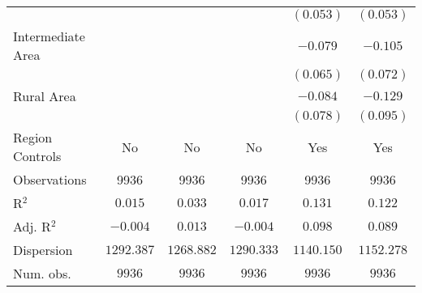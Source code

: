\begin{center}
\begin{tiny}
\begin{longtable}{l@{} c@{} c@{} c@{} c@{} c@{}}
                                                      &                 &                  &                 & $(0.053)$        & $(0.053)$        \\
\quad Intermediate Area                               &                 &                  &                 & $-0.079$         & $-0.105$         \\
                                                      &                 &                  &                 & $(0.065)$        & $(0.072)$        \\
\quad Rural Area                                      &                 &                  &                 & $-0.084$         & $-0.129$         \\
                                                      &                 &                  &                 & $(0.078)$        & $(0.095)$        \\
\hline
Region Controls                                       & No              & No               & No              & Yes              & Yes              \\
Observations                                          & 9936            & 9936             & 9936            & 9936             & 9936             \\
R$^2$                                                 & $0.015$         & $0.033$          & $0.017$         & $0.131$          & $0.122$          \\
Adj. R$^2$                                            & $-0.004$        & $0.013$          & $-0.004$        & $0.098$          & $0.089$          \\
Dispersion                                            & $1292.387$      & $1268.882$       & $1290.333$      & $1140.150$       & $1152.278$       \\
Num. obs.                                             & $9936$          & $9936$           & $9936$          & $9936$           & $9936$           \\
\end{longtable}
\end{tiny}
\end{center}
